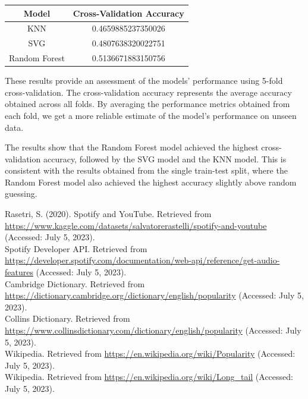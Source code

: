 \documentclass[11pt]{article} %
\begin{document}
\begin{table}[H]
	\centering
	\begin{tabular}{cc}
	\hline
	\textbf{Model} & \textbf{Cross-Validation Accuracy} \\
	\hline
	KNN & 0.4659885237350026 \\
	SVG & 0.4807638320022751 \\
	Random Forest & 0.5136671883150756 \\
	\hline
	\end{tabular}
\end{table}


These results provide an assessment of the models' performance using 5-fold cross-validation. The cross-validation accuracy represents the average accuracy obtained across all folds.
By averaging the performance metrics obtained from each fold, we get a more reliable estimate of the model's performance on unseen data. 

The results show that the Random Forest model achieved the highest cross-validation accuracy, followed by the SVG model and the KNN model. This is consistent with the results obtained from the single train-test split, where the Random Forest model also achieved the highest accuracy slightly above random guessing.



\newpage

\begin{thebibliography}{9}
	 Rasetri, S. (2020). Spotify and YouTube. Retrieved from \href{https://www.kaggle.com/datasets/salvatorerastelli/spotify-and-youtube}{https://www.kaggle.com/datasets/salvatorerastelli/spotify-and-youtube} (Accessed: July 5, 2023).\\
	 Spotify Developer API. Retrieved from \href{https://developer.spotify.com/documentation/web-api/reference/get-audio-features}{https://developer.spotify.com/documentation/web-api/reference/get-audio-features} (Accessed: July 5, 2023).\\
	 Cambridge Dictionary. Retrieved from \href{https://dictionary.cambridge.org/dictionary/english/popularity}{https://dictionary.cambridge.org/dictionary/english/popularity} (Accessed: July 5, 2023).\\
	 Collins Dictionary. Retrieved from \href{https://www.collinsdictionary.com/dictionary/english/popularity}{https://www.collinsdictionary.com/dictionary/english/popularity} (Accessed: July 5, 2023).\\
	 Wikipedia. Retrieved from \href{https://en.wikipedia.org/wiki/Popularity}{https://en.wikipedia.org/wiki/Popularity} (Accessed: July 5, 2023).\\
	 Wikipedia. Retrieved from \href{https://en.wikipedia.org/wiki/Long_tail}{https://en.wikipedia.org/wiki/Long\_tail} (Accessed: July 5, 2023).\\
\end{thebibliography}
\end{document}
